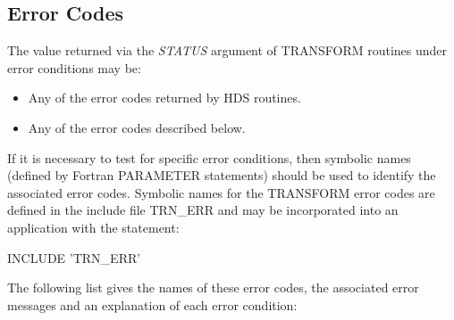 \documentclass[twoside,nolof,11pt]{starlink}
\providecommand{\name}[1]{\small{#1}}
\providecommand{\fortvar}[1]{\emph{#1}}
\begin{document}
\subsection{Error Codes}

The value returned via the \fortvar{STATUS} argument of \name{TRANSFORM}
routines under error conditions may be:

\begin{itemize}

\item Any of the error codes returned by \name{HDS} routines.

\item Any of the error codes described below.

\end{itemize}

If it is necessary to test for specific error conditions, then symbolic
names (defined by Fortran \name{PARAMETER} statements) should be used to
identify the associated error codes.
Symbolic names for the \name{TRANSFORM} error codes are defined in the
include file \name{TRN\_ERR} and may be incorporated into an application
with the statement:

\begin{terminalv}
INCLUDE 'TRN_ERR'
\end{terminalv}

The following list gives the names of these error codes, the associated
error messages and an explanation of each error condition:
\end{document}
